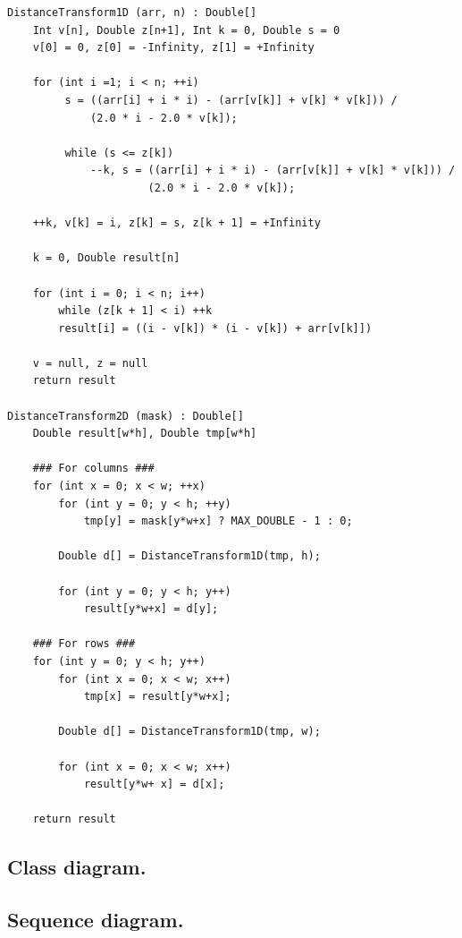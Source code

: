 \documentclass[a4paper,11pt,oneside]{article}
\begin{document}
\begin{verbatim}
DistanceTransform1D (arr, n) : Double[]
    Int v[n], Double z[n+1], Int k = 0, Double s = 0
    v[0] = 0, z[0] = -Infinity, z[1] = +Infinity

    for (int i =1; i < n; ++i)
         s = ((arr[i] + i * i) - (arr[v[k]] + v[k] * v[k])) / 
             (2.0 * i - 2.0 * v[k]);

         while (s <= z[k])
             --k, s = ((arr[i] + i * i) - (arr[v[k]] + v[k] * v[k])) / 
                      (2.0 * i - 2.0 * v[k]);

    ++k, v[k] = i, z[k] = s, z[k + 1] = +Infinity

    k = 0, Double result[n]

    for (int i = 0; i < n; i++)
        while (z[k + 1] < i) ++k
        result[i] = ((i - v[k]) * (i - v[k]) + arr[v[k]])

    v = null, z = null
    return result

DistanceTransform2D (mask) : Double[]
    Double result[w*h], Double tmp[w*h]

    ### For columns ###
    for (int x = 0; x < w; ++x)
        for (int y = 0; y < h; ++y)
            tmp[y] = mask[y*w+x] ? MAX_DOUBLE - 1 : 0;

        Double d[] = DistanceTransform1D(tmp, h);

        for (int y = 0; y < h; y++)
            result[y*w+x] = d[y];

    ### For rows ###
    for (int y = 0; y < h; y++)
        for (int x = 0; x < w; x++)
            tmp[x] = result[y*w+x];

        Double d[] = DistanceTransform1D(tmp, w);

        for (int x = 0; x < w; x++)
            result[y*w+ x] = d[x];

    return result
\end{verbatim}

\newpage
\subsection{Class diagram.}


\newpage
\subsection{Sequence diagram.}
\end{document}

